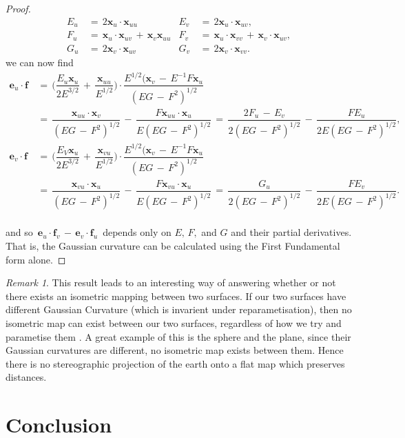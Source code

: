 \documentclass{UKZNcomp}
\newcommand{\vect}[1]{\mathbf{#1}} %
\theoremstyle{definition}
\theoremstyle{remark}
\newtheorem*{remark}{Remark}
\begin{document}
\begin{proof}
\begin{align*}
E_u\,&=\,2\vect x_u\cdot\vect x_{uu} &E_v\,&=\,2\vect x_u\cdot\vect x_{uv},\\
F_u\,&=\,\vect x_u\cdot\vect x_{uv}\,+\,\vect x_v\vect x_{uu} &F_v\,&=\,\vect x_u\cdot\vect x_{vv}\,+\,\vect x_v\cdot\vect x_{uv},\\
G_u\,&=\,2\vect x_v\cdot\vect x_{uv} &G_v\,&=\,2\vect x_v\cdot\vect x_{vv}.
\end{align*}
we can now find
\begin{align*}
\vect e_u\cdot\vect f\,&=\,\Bigg(\dfrac{E_u\vect x_u}{2E^{3/2}}\,+\,\dfrac{\vect x_{uu}}{E^{1/2}}\Bigg)\cdot\dfrac{E^{1/2}(\vect x_v\,-\,E^{-1}F\vect x_u}{(EG\,-\,F^2)^{1/2}}\\
&=\,\dfrac{\vect x_{uu}\cdot\vect x_v}{(EG\,-\,F^2)^{1/2}}\,-\,\dfrac{F\vect x_{uu}\cdot\vect x_u}{E(EG\,-\,F^2)^{1/2}}\,=\,\dfrac{2F_u\,-\,E_v}{2(EG\,-\,F^2)^{1/2}}\,-\,\dfrac{FE_u}{2E(EG\,-\,F^2)^{1/2}},\\
\vect e_v\cdot\vect f\,&=\,\Bigg(\dfrac{E_V\vect x_u}{2E^{3/2}}\,+\,\dfrac{\vect x_{vu}}{E^{1/2}}\Bigg)\cdot\dfrac{E^{1/2}(\vect x_v\,-\,E^{-1}F\vect x_u}{(EG\,-\,F^2)^{1/2}}\\
&=\,\dfrac{\vect x_{vu}\cdot\vect x_u}{(EG\,-\,F^2)^{1/2}}\,-\,\dfrac{F\vect x_{vu}\cdot\vect x_u}{E(EG\,-\,F^2)^{1/2}}\,=\,\dfrac{G_u}{2(EG\,-\,F^2)^{1/2}}\,-\,\dfrac{FE_v}{2E(EG\,-\,F^2)^{1/2}}.\\
\end{align*}

and so $\,\vect e_u\cdot\vect f_v\,-\,\vect e_v\cdot\vect f_u\,$ depends only on $E,\,F,$ and $G$ and their partial derivatives. That is, the Gaussian curvature can be calculated using the First Fundamental form alone.
\end{proof}

\begin{remark}
This result leads to an interesting way of answering whether or not there exists an isometric mapping between two surfaces. If our two surfaces have different Gaussian Curvature (which is invarient under reparametisation), then no isometric map can exist between our two surfaces, regardless of how we try and parametise them \cite{DC1976}. A great example of this is the sphere and the plane, since their Gaussian curvatures are different, no isometric map exists between them. Hence there is no stereographic projection of the earth onto a flat map which preserves distances. 
\end{remark}
\chapter{Conclusion}
\end{document}
